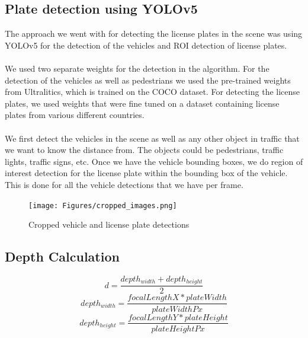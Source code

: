 \documentclass[12pt]{article}
\begin{document}
\subsection{Plate detection using YOLOv5}
The approach we went with for detecting the license plates in the scene was using YOLOv5 for the detection of the vehicles and ROI detection of license plates.
\\ \\
We used two separate weights for the detection in the algorithm.
For the detection of the vehicles as well as pedestrians we used the pre-trained weights from Ultralitics, which is trained on the COCO dataset.
For detecting the license plates, we used weights that were fine tuned on a dataset containing license plates from various different countries.
\\ \\
We first detect the vehicles in the scene as well as any other object in traffic that we want to know the distance from. The objects could be pedestrians, traffic lights, traffic signs, etc.
Once we have the vehicle bounding boxes, we do region of interest detection for the license plate within the bounding box of the vehicle. This is done for all the vehicle detections that we have per frame.
\begin{figure}[H]
    \centering
    \texttt{[image: Figures/cropped\_images.png]}
    \caption{Cropped vehicle and license plate detections}
    \label{fig:my_label}
\end{figure}


\subsection{Depth Calculation}

\begin{equation}\label{eq:avgDepth}
    d = \frac{depth_{width} + depth_{height}}{2}
\end{equation}
\begin{equation}\label{eg:depthWidth}
    depth_{width} = \frac{focalLengthX * plateWidth}{plateWidthPx}
\end{equation}
\begin{equation}\label{eg:depthHeight}
    depth_{height} = \frac{focalLengthY * plateHeight}{plateHeightPx}
\end{equation}
\end{document}
